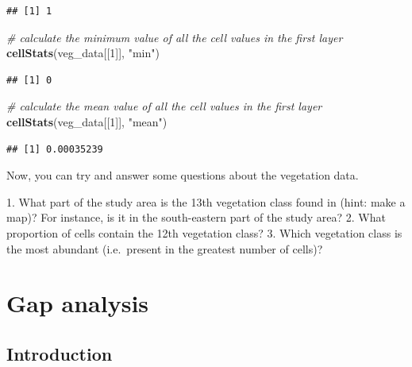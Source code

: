 \documentclass[12pt,]{book}
\makeatletter
\newenvironment{Shaded}{\begin{snugshade}}{\end{snugshade}}
\newcommand{\KeywordTok}[1]{\textcolor[rgb]{0.13,0.29,0.53}{\textbf{#1}}}
\newcommand{\DecValTok}[1]{\textcolor[rgb]{0.00,0.00,0.81}{#1}}
\newcommand{\StringTok}[1]{\textcolor[rgb]{0.31,0.60,0.02}{#1}}
\newcommand{\CommentTok}[1]{\textcolor[rgb]{0.56,0.35,0.01}{\textit{#1}}}
\newcommand{\NormalTok}[1]{#1}
\newenvironment{kframe}{%
\medskip{}
\setlength{\fboxsep}{.8em}
 \def\at@end@of@kframe{}%
 \ifinner\ifhmode%
  \def\at@end@of@kframe{\end{minipage}}%
  \begin{minipage}{\columnwidth}%
 \fi\fi%
 \def\FrameCommand##1{\hskip\@totalleftmargin \hskip-\fboxsep
 \colorbox{shadecolor}{##1}\hskip-\fboxsep
     \hskip-\linewidth \hskip-\@totalleftmargin \hskip\columnwidth}%
 \MakeFramed {\advance\hsize-\width
   \@totalleftmargin\z@ \linewidth\hsize
   \@setminipage}}%
 {\par\unskip\endMakeFramed%
 \at@end@of@kframe}
\newenvironment{rmdblock}[1]
  {
  \begin{itemize}
  \renewcommand{\labelitemi}{
    \raisebox{-.7\height}[0pt][0pt]{
      {\setkeys{Gin}{width=3em,keepaspectratio}\texttt{[image: images/\#1]}}
    }
  }
  \setlength{\fboxsep}{1em}
  \begin{kframe}
  \item
  }
  {
  \end{kframe}
  \end{itemize}
  }
\newenvironment{rmdquestion}
  {\begin{rmdblock}{question}}
  {\end{rmdblock}}
\makeatother
\begin{document}
\begin{verbatim}
## [1] 1
\end{verbatim}

\begin{Shaded}
\begin{Highlighting}[]
\CommentTok{# calculate the minimum value of all the cell values in the first layer}
\KeywordTok{cellStats}\NormalTok{(veg_data[[}\DecValTok{1}\NormalTok{]], }\StringTok{"min"}\NormalTok{)}
\end{Highlighting}
\end{Shaded}

\begin{verbatim}
## [1] 0
\end{verbatim}

\begin{Shaded}
\begin{Highlighting}[]
\CommentTok{# calculate the mean value of all the cell values in the first layer}
\KeywordTok{cellStats}\NormalTok{(veg_data[[}\DecValTok{1}\NormalTok{]], }\StringTok{"mean"}\NormalTok{)}
\end{Highlighting}
\end{Shaded}

\begin{verbatim}
## [1] 0.00035239
\end{verbatim}

\clearpage

Now, you can try and answer some questions about the vegetation data.

\begin{rmdquestion} 1. What part of the study area is the 13th
vegetation class found in (hint: make a map)? For instance, is it in the
south-eastern part of the study area? 2. What proportion of cells
contain the 12th vegetation class? 3. Which vegetation class is the most
abundant (i.e.~present in the greatest number of cells)?
\end{rmdquestion}

\chapter{Gap analysis}\label{gap-analysis}

\section{Introduction}\label{introduction-1}
\end{document}
